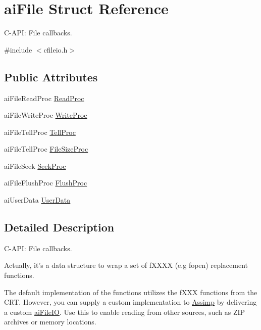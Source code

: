 \hypertarget{structaiFile}{\section{ai\-File \-Struct \-Reference}
\label{structaiFile}
}


\-C-\/\-A\-P\-I\-: \-File callbacks.  




{\ttfamily \#include $<$cfileio.\-h$>$}

\subsection*{\-Public \-Attributes}
\begin{DoxyCompactItemize}
\item 
ai\-File\-Read\-Proc \hyperlink{structaiFile_a52287e81ca67b9d43cc1ce6142f781fa}{\-Read\-Proc}
\item 
ai\-File\-Write\-Proc \hyperlink{structaiFile_ab9fca3a62e34a33592c13a6f31db7d1d}{\-Write\-Proc}
\item 
ai\-File\-Tell\-Proc \hyperlink{structaiFile_aaf2d88a3b2fcbdacf51119658283d27e}{\-Tell\-Proc}
\item 
ai\-File\-Tell\-Proc \hyperlink{structaiFile_aff2fff8c0458e7ec71f7de217c3a3033}{\-File\-Size\-Proc}
\item 
ai\-File\-Seek \hyperlink{structaiFile_a7a07b499be4ad433669246479a4d4ad2}{\-Seek\-Proc}
\item 
ai\-File\-Flush\-Proc \hyperlink{structaiFile_a1102d28d1c0be68ffed20476669bdb0d}{\-Flush\-Proc}
\item 
ai\-User\-Data \hyperlink{structaiFile_aec528fa18f4755fe4f28d604fde28aad}{\-User\-Data}
\end{DoxyCompactItemize}


\subsection{\-Detailed \-Description}
\-C-\/\-A\-P\-I\-: \-File callbacks. 

\-Actually, it's a data structure to wrap a set of f\-X\-X\-X\-X (e.\-g fopen) replacement functions.

\-The default implementation of the functions utilizes the f\-X\-X\-X functions from the \-C\-R\-T. \-However, you can supply a custom implementation to \hyperlink{namespaceAssimp}{\-Assimp} by delivering a custom \hyperlink{structaiFileIO}{ai\-File\-I\-O}. \-Use this to enable reading from other sources, such as \-Z\-I\-P archives or memory locations. 

